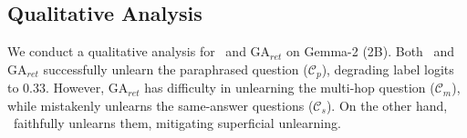 





\subsection{Qualitative Analysis}
\label{exp:case_study}
We conduct a qualitative analysis for \ourmodel~and GA$_{ret}$ on Gemma-2 (2B).
Both \ourmodel~and GA$_{ret}$ successfully unlearn the paraphrased question ($\mathcal{C}_{p}$), degrading label logits to 0.33.
However, GA$_{ret}$ has difficulty in unlearning the multi-hop question ($\mathcal{C}_{m}$), while mistakenly unlearns the same-answer questions ($\mathcal{C}_{s}$).
On the other hand, \ourmodel~faithfully unlearns them, mitigating superficial unlearning.









